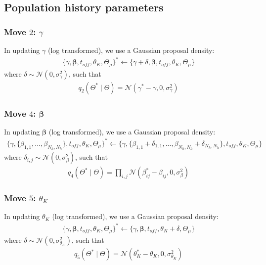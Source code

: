 \documentclass[a4paper,18pt]{report}
\begin{document}
\subsection{Population history parameters}
\subsubsection{Move $2$: $\gamma$}
In updating $\gamma$ (log transformed), we use a Gaussian proposal density:
\begin{eqnarray}
 \{\gamma, \boldsymbol{\beta}, t_{off}, \theta_K, \Theta_{\mu}\}^*\leftarrow \{\gamma + \delta, \boldsymbol{\beta}, t_{off}, \theta_K,  \Theta_{\mu}\}
\end{eqnarray}
where $\delta\sim\mathcal{N}(0,\sigma_{\gamma}^2)$, such that 
\begin{eqnarray}
q_2(\Theta^*\mid\Theta) = \mathcal{N}(\gamma^*-\gamma,0,\sigma_{\gamma}^2)
\end{eqnarray}
\subsubsection{Move $4$: $\boldsymbol{\beta}$}
In updating $\boldsymbol{\beta}$ (log transformed), we use a Gaussian proposal density:
\begin{eqnarray}
 \{\gamma, \{\beta_{1,1},...,\beta_{N_h,N_h}\}, t_{off}, \theta_K, \Theta_{\mu}\}^*\leftarrow \{\gamma, \{\beta_{1,1} + \delta_{1,1},...,\beta_{N_h,N_h} + \delta_{N_h, N_h}\}, t_{off}, \theta_K,  \Theta_{\mu}\}
\end{eqnarray}
where $\delta_{i,j}\sim\mathcal{N}(0,\sigma_{\beta}^2)$, such that 
\begin{eqnarray}
q_4(\Theta^*\mid\Theta) = \prod_{i,j}\mathcal{N}(\beta_{ij}^*-\beta_{ij},0,\sigma_{\beta}^2)
\end{eqnarray}
\subsubsection{Move $5$: $\theta_K$}
In updating $\theta_K$ (log transformed), we use a Gaussian proposal density:
\begin{eqnarray}
 \{\gamma, \boldsymbol{\beta}, t_{off}, \theta_K, \Theta_{\mu}\}^*\leftarrow \{\gamma , \boldsymbol{\beta}, t_{off}, \theta_K+ \delta,  \Theta_{\mu}\}
\end{eqnarray}
where $\delta\sim\mathcal{N}(0,\sigma_{\theta_K}^2)$, such that 
\begin{eqnarray}
q_5(\Theta^*\mid\Theta) = \mathcal{N}(\theta_K^*-\theta_K,0,\sigma_{\theta_K}^2)
\end{eqnarray}
\end{document}
